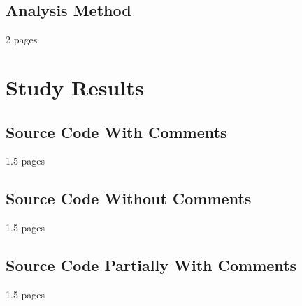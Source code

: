 \subsection{Analysis Method}

2 pages

\section{Study Results}

\subsection{Source Code With Comments}

1.5 pages

\subsection{Source Code Without Comments}

1.5 pages

\subsection{Source Code Partially With Comments}

1.5 pages